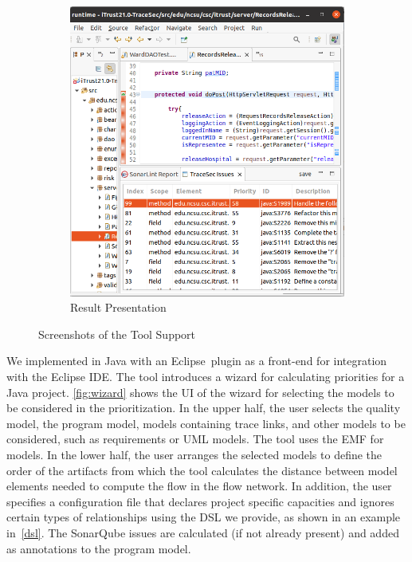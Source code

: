 \begin{figure}
    \begin{subfigure}{.61\columnwidth}
    \includegraphics[width=\columnwidth]{figures/tracesec-impl-results.png}
    \caption{Result Presentation}
    \label{fig:results}
    \end{subfigure}
    \caption{Screenshots of the Tool Support}
    \label{fig:impl}
\end{figure}

We implemented \appr{} in Java with an Eclipse\,\cite{eclipse} plugin as a front-end for integration with the Eclipse IDE.
The tool introduces a wizard for calculating priorities for a Java project.
\autoref{fig:wizard} shows the UI of the wizard for selecting the models to be considered in the prioritization.
In the upper half, the user selects the quality model, the program model, models containing trace links, and other models to be considered, such as requirements or UML models.
The tool uses the EMF for models.
In the lower half, the user arranges the selected models to define the order of the artifacts from which the tool calculates the distance between model elements needed to compute the flow in the flow network. In addition, the user specifies a configuration file that declares project specific capacities and ignores certain types of relationships using the DSL we provide, as shown in an example in~\autoref{dsl}.
The SonarQube issues are calculated (if not already present) and added as annotations to the program model.

